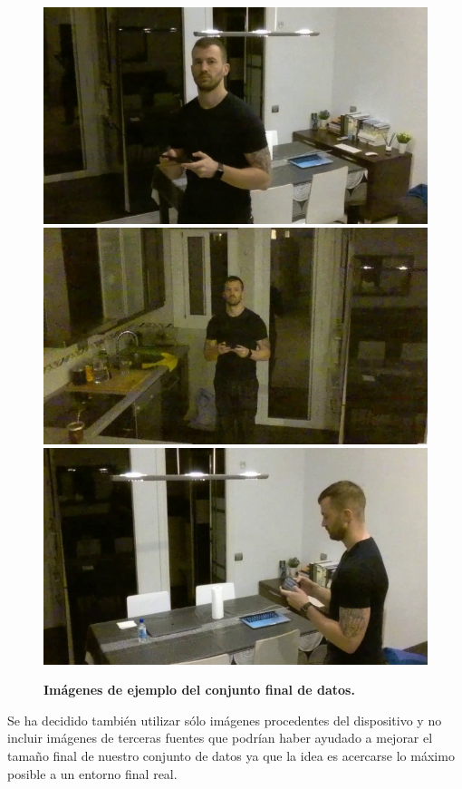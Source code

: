 \begin{figure}[ht!]
    \centering
    \includegraphics[scale=0.2]{figuras/dataset/image2.jpg}
    \includegraphics[scale=0.2]{figuras/dataset/image7.jpg}
    \includegraphics[scale=0.2]{figuras/dataset/image8.jpg}
    \caption[Imágenes de ejemplo del conjunto final de datos]{\textbf{Imágenes de ejemplo del conjunto final de datos.}}
    \label{fig-dataset-imagenes-ejemplo}
\end{figure}
\medskip
Se ha decidido también utilizar sólo imágenes procedentes del dispositivo y no incluir imágenes de terceras fuentes que podrían haber ayudado a mejorar el tamaño final de nuestro conjunto de datos ya que la idea es acercarse lo máximo posible a un entorno final real.
\medskip

